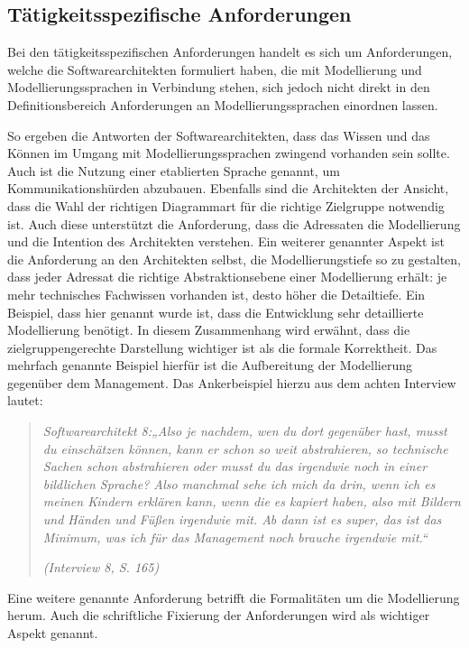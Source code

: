 \subsection{Tätigkeitsspezifische Anforderungen}

Bei den tätigkeitsspezifischen Anforderungen handelt es sich um Anforderungen, welche die Softwarearchitekten formuliert haben, die mit Modellierung und Modellierungssprachen in Verbindung stehen, sich jedoch nicht direkt in den Definitionsbereich Anforderungen an Modellierungssprachen einordnen lassen.

So ergeben die Antworten der Softwarearchitekten, dass das Wissen und das Können im Umgang mit Modellierungssprachen zwingend vorhanden sein sollte. Auch ist die Nutzung einer etablierten Sprache genannt, um Kommunikationshürden abzubauen. Ebenfalls sind die Architekten der Ansicht, dass die Wahl der richtigen Diagrammart für die richtige Zielgruppe notwendig ist. 
Auch diese unterstützt die Anforderung, dass die Adressaten die Modellierung und die Intention des Architekten verstehen. Ein weiterer genannter Aspekt ist die Anforderung an den Architekten selbst, die Modellierungstiefe so zu gestalten, dass jeder Adressat die richtige Abstraktionsebene einer Modellierung erhält: je mehr technisches Fachwissen vorhanden ist, desto höher die Detailtiefe. Ein Beispiel, dass hier genannt wurde ist, dass die Entwicklung sehr detaillierte Modellierung benötigt. In diesem Zusammenhang wird erwähnt, dass die zielgruppengerechte Darstellung wichtiger ist als die formale Korrektheit. Das mehrfach genannte Beispiel hierfür ist die Aufbereitung der Modellierung gegenüber dem Management.
Das Ankerbeispiel hierzu aus dem achten Interview lautet: 

\begin{quote}
\textit{Softwarearchitekt 8:„Also je nachdem, wen du dort gegenüber hast, musst du einschätzen können, kann er schon so weit abstrahieren, so technische Sachen schon abstrahieren oder musst du das irgendwie noch in einer bildlichen Sprache? Also manchmal sehe ich mich da drin, wenn ich es meinen Kindern erklären kann, wenn die es kapiert haben, also mit Bildern und Händen und Füßen irgendwie mit. Ab dann ist es super, das ist das Minimum, was ich für das Management noch brauche irgendwie mit.“}

\hfill \textit{(Interview 8, S. 165)}
\end{quote}

Eine weitere genannte Anforderung betrifft die Formalitäten um die Modellierung herum. Auch die schriftliche Fixierung der Anforderungen wird als wichtiger Aspekt genannt.

